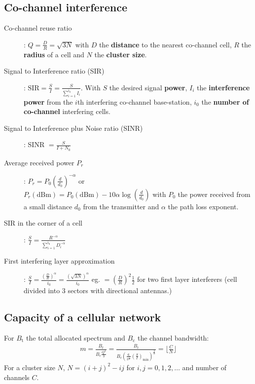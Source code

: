 \documentclass[6pt]{scrartcl}
\begin{document}
\begin{multicols}{4}
\subsection{Co-channel interference}
\begin{description}
\item[Co-channel reuse ratio]: $Q = \frac{D}{R} = \sqrt{3N}$ with $D$ the \textbf{distance} to the nearest co-channel cell, $R$ the \textbf{radius} of a cell and $N$ the \textbf{cluster size}.

\item[Signal to Interference ratio (SIR)]: $\textrm{SIR} = \frac{S}{I} = \frac{S}{\sum^{i_0}_{i=1}I_i}$. With $S$ the desired signal \textbf{power}, $I_i$ the \textbf{interference power} from the $i$th interfering co-channel base-station, $i_0$ the \textbf{number of co-channel} interfering cells.

\item[Signal to Interference plus Noise ratio (SINR)] : SINR $= \frac{S}{I + N_0}$

\item[Average received power $P_r$]: $P_r = P_0(\frac{d}{d_0})^{-\alpha}$ or \\ 
$P_r(\textrm{dBm}) = P_0(\textrm{dBm})-10\alpha\log(\frac{d}{d_0})$ with $P_0$ the power received from a small distance $d_0$ from the transmitter and $\alpha$ the path loss exponent.
	
\item[SIR in the corner of a cell]: $\frac{S}{I} = \frac{R^{-\alpha}}{\sum^{i_0}_{i=1}D_i^{-\alpha}}$

\item[First interfering layer approximation]: $\frac{S}{I} = \frac{(\frac{D}{R})^\alpha}{i_0} = \frac{(\sqrt{3N})^\alpha}{i_0}$ eg. $=(\frac{D}{R})^2\frac{1}{2}$ for two first layer interferers (cell divided into 3 sectors with directional antennas.)

\end{description}

\subsection{Capacity of a cellular network}
For $B_\textrm{t}$ the total allocated spectrum and $B_\textrm{c}$ the channel bandwidth: 
\begin{align*}
m = \frac{B_t}{B_c \frac{Q^2}{3}} = \frac{B_t}{B_c\left(\frac{6}{3^{\frac{\alpha}{2}}}\left(\frac{S}{I}\right)_\textrm{min}\right)^{\frac{2}{\alpha}}} = \lfloor\frac CN\rfloor
\end{align*}
For a cluster size $N$, $N = (i + j)^2 - ij$ for $i,j=0,1,2,\ldots$ and number of channels $C$.


\end{multicols}
\end{document}
